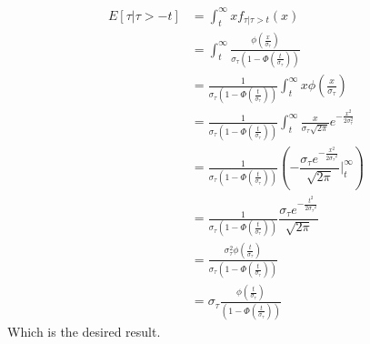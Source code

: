 \documentclass[12pt,twoside]{reedthesis}
\theoremstyle{definition}
\begin{document}
\begin{align*}
E[\tau | \tau > - t] &= \int_t^\infty x f_{\tau | \tau > t}(x) \\
&= \int_t^\infty \frac{\phi(\frac{x}{\sigma_\tau})}{\sigma_\tau(1 - \Phi(\frac{t}{\sigma_\tau}))} \\
&= \frac{1}{\sigma_\tau(1 - \Phi(\frac{t}{\sigma_\tau}))} \int_t^\infty x \phi(\frac{x}{\sigma_\tau})  \\
&= \frac{1}{\sigma_\tau(1 - \Phi(\frac{t}{\sigma_\tau}))} \int_t^\infty  \frac{x}{\sigma_\tau \sqrt{2 \pi}}e^{-\frac{x^2}{2 \sigma_\tau^2}} \\
&= \frac{1}{\sigma_\tau(1 - \Phi(\frac{t}{\sigma_\tau}))} \left( -\dfrac{{\sigma_\tau}e^{-\frac{x^2}{2{\sigma_\tau}^2}}}{\sqrt{{2\pi}}} \bigg |_t^\infty \right) \\
&= \frac{1}{\sigma_\tau(1 - \Phi(\frac{t}{\sigma_\tau}))} \dfrac{{\sigma_\tau}e^{-\frac{t^2}{2{\sigma_\tau}^2}}}{\sqrt{{2\pi}}}  \\
&= \frac{\sigma_\tau^2 \phi(\frac{t}{\sigma_\tau})}{\sigma_\tau(1 - \Phi(\frac{t}{\sigma_\tau}))} \\
&= \sigma_\tau  \frac{\phi(\frac{t}{\sigma_\tau})}{(1 - \Phi(\frac{t}{\sigma_\tau}))} 
\end{align*}
Which is the desired result.


\end{document}
